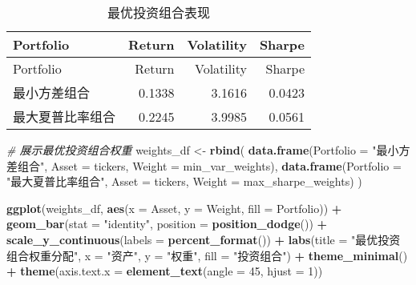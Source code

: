 \documentclass[
]{article}
\newenvironment{Shaded}{\begin{snugshade}}{\end{snugshade}}
\newcommand{\AttributeTok}[1]{\textcolor[rgb]{0.13,0.29,0.53}{#1}}
\newcommand{\CommentTok}[1]{\textcolor[rgb]{0.56,0.35,0.01}{\textit{#1}}}
\newcommand{\DecValTok}[1]{\textcolor[rgb]{0.00,0.00,0.81}{#1}}
\newcommand{\FunctionTok}[1]{\textcolor[rgb]{0.13,0.29,0.53}{\textbf{#1}}}
\newcommand{\NormalTok}[1]{#1}
\newcommand{\OtherTok}[1]{\textcolor[rgb]{0.56,0.35,0.01}{#1}}
\newcommand{\SpecialCharTok}[1]{\textcolor[rgb]{0.81,0.36,0.00}{\textbf{#1}}}
\newcommand{\StringTok}[1]{\textcolor[rgb]{0.31,0.60,0.02}{#1}}
\begin{document}
\begin{longtable}[]{@{}lrrr@{}}
\caption{最优投资组合表现}\tabularnewline
\toprule\noalign{}
Portfolio & Return & Volatility & Sharpe \\
\midrule\noalign{}
\endfirsthead
\toprule\noalign{}
Portfolio & Return & Volatility & Sharpe \\
\midrule\noalign{}
\endhead
\bottomrule\noalign{}
\endlastfoot
最小方差组合 & 0.1338 & 3.1616 & 0.0423 \\
最大夏普比率组合 & 0.2245 & 3.9985 & 0.0561 \\
\end{longtable}

\begin{Shaded}
\begin{Highlighting}[]
\CommentTok{\# 展示最优投资组合权重}
\NormalTok{weights\_df }\OtherTok{\textless{}{-}} \FunctionTok{rbind}\NormalTok{(}
  \FunctionTok{data.frame}\NormalTok{(}\AttributeTok{Portfolio =} \StringTok{"最小方差组合"}\NormalTok{, }\AttributeTok{Asset =}\NormalTok{ tickers, }\AttributeTok{Weight =}\NormalTok{ min\_var\_weights),}
  \FunctionTok{data.frame}\NormalTok{(}\AttributeTok{Portfolio =} \StringTok{"最大夏普比率组合"}\NormalTok{, }\AttributeTok{Asset =}\NormalTok{ tickers, }\AttributeTok{Weight =}\NormalTok{ max\_sharpe\_weights)}
\NormalTok{)}

\FunctionTok{ggplot}\NormalTok{(weights\_df, }\FunctionTok{aes}\NormalTok{(}\AttributeTok{x =}\NormalTok{ Asset, }\AttributeTok{y =}\NormalTok{ Weight, }\AttributeTok{fill =}\NormalTok{ Portfolio)) }\SpecialCharTok{+}
  \FunctionTok{geom\_bar}\NormalTok{(}\AttributeTok{stat =} \StringTok{"identity"}\NormalTok{, }\AttributeTok{position =} \FunctionTok{position\_dodge}\NormalTok{()) }\SpecialCharTok{+}
  \FunctionTok{scale\_y\_continuous}\NormalTok{(}\AttributeTok{labels =} \FunctionTok{percent\_format}\NormalTok{()) }\SpecialCharTok{+}
  \FunctionTok{labs}\NormalTok{(}\AttributeTok{title =} \StringTok{"最优投资组合权重分配"}\NormalTok{,}
       \AttributeTok{x =} \StringTok{"资产"}\NormalTok{,}
       \AttributeTok{y =} \StringTok{"权重"}\NormalTok{,}
       \AttributeTok{fill =} \StringTok{"投资组合"}\NormalTok{) }\SpecialCharTok{+}
  \FunctionTok{theme\_minimal}\NormalTok{() }\SpecialCharTok{+}
  \FunctionTok{theme}\NormalTok{(}\AttributeTok{axis.text.x =} \FunctionTok{element\_text}\NormalTok{(}\AttributeTok{angle =} \DecValTok{45}\NormalTok{, }\AttributeTok{hjust =} \DecValTok{1}\NormalTok{))}
\end{Highlighting}
\end{Shaded}
\end{document}
